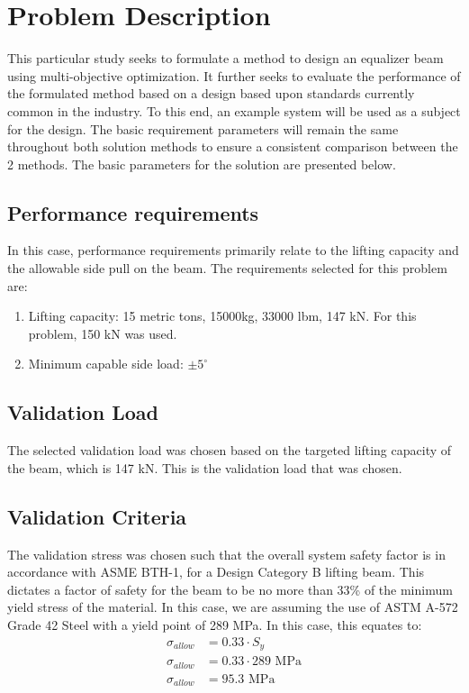 \chapter{Problem Description}
This particular study seeks to formulate a method to design an equalizer beam using multi-objective optimization. It further seeks to evaluate the performance of the formulated method based on a design based upon standards currently common in the industry.
To this end, an example system will be used as a subject for the design. The basic requirement parameters will remain the same throughout both solution methods to ensure a consistent comparison between the 2 methods. The basic parameters for the solution are presented below. 

\section{Performance requirements}
In this case, performance requirements primarily relate to the lifting capacity and the allowable side pull on the beam. The requirements selected for this problem are: 
\begin{enumerate}
\item Lifting capacity: 15 metric tons, 15000kg, 33000 lbm, 147 kN. For this problem, 150 kN was used. 
\item Minimum capable side load: $\pm 5^{\circ} $
\end{enumerate}
\section{Validation Load}
The selected validation load was chosen based on the targeted lifting capacity of the beam, which is 147 kN. This is the validation load that was chosen. 
\section{Validation Criteria}
The validation stress was chosen such that the overall system safety factor is in accordance with ASME BTH-1, for a Design Category B lifting beam. This dictates a factor of safety for the beam to be no more than 33\% of the minimum yield stress of the material. In this case, we are assuming the use of ASTM A-572 Grade 42 Steel with a yield point of 289 MPa. 
In this case, this equates to:
\begin{align*}
	\sigma_{\mathit{allow}} &= 0.33 \cdot S_{y}\\
	\sigma_{allow} &= 0.33 \cdot 289  \text{ MPa} \\
	\sigma_{allow} &= 95.3 \text{ MPa}
\end{align*}
